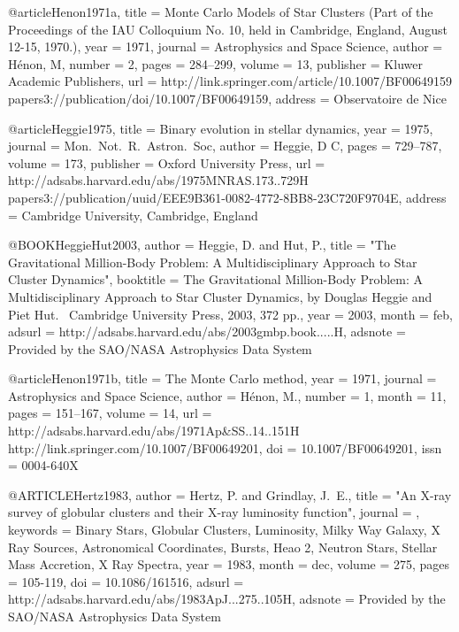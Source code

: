 \documentclass[twocolumn,tighten]{aastex63}
\begin{document}
{{{{{@article{Henon1971a,
    title = {{Monte Carlo Models of Star Clusters (Part of the Proceedings of the IAU Colloquium No. 10, held in Cambridge, England, August 12-15, 1970.)}},
    year = {1971},
    journal = {Astrophysics and Space Science},
    author = {H{\'{e}}non, M},
    number = {2},
    pages = {284--299},
    volume = {13},
    publisher = {Kluwer Academic Publishers},
    url = {http://link.springer.com/article/10.1007/BF00649159 papers3://publication/doi/10.1007/BF00649159},
    address = {Observatoire de Nice}
}

@article{Heggie1975,
    title = {{Binary evolution in stellar dynamics}},
    year = {1975},
    journal = {Mon.~Not.~R.~Astron.~Soc},
    author = {Heggie, D C},
    pages = {729--787},
    volume = {173},
    publisher = {Oxford University Press},
    url = {http://adsabs.harvard.edu/abs/1975MNRAS.173..729H papers3://publication/uuid/EEE9B361-0082-4772-8BB8-23C720F9704E},
    address = {Cambridge University, Cambridge, England}
}

@BOOK{HeggieHut2003,
   author = {{Heggie}, D. and {Hut}, P.},
    title = "{The Gravitational Million-Body Problem: A Multidisciplinary Approach to Star Cluster Dynamics}",
booktitle = {The Gravitational Million-Body Problem: A Multidisciplinary Approach to Star Cluster Dynamics, by Douglas Heggie and Piet Hut.~ Cambridge University Press, 2003, 372 pp.},
     year = 2003,
    month = feb,
   adsurl = {http://adsabs.harvard.edu/abs/2003gmbp.book.....H},
  adsnote = {Provided by the SAO/NASA Astrophysics Data System}
}

@article{Henon1971b,
    title = {{The Monte Carlo method}},
    year = {1971},
    journal = {Astrophysics and Space Science},
    author = {H{\'{e}}non, M.},
    number = {1},
    month = {11},
    pages = {151--167},
    volume = {14},
    url = {http://adsabs.harvard.edu/abs/1971Ap&SS..14..151H http://link.springer.com/10.1007/BF00649201},
    doi = {10.1007/BF00649201},
    issn = {0004-640X}
}

@ARTICLE{Hertz1983,
   author = {{Hertz}, P. and {Grindlay}, J.~E.},
    title = "{An X-ray survey of globular clusters and their X-ray luminosity function}",
  journal = {\apj},
 keywords = {Binary Stars, Globular Clusters, Luminosity, Milky Way Galaxy, X Ray Sources, Astronomical Coordinates, Bursts, Heao 2, Neutron Stars, Stellar Mass Accretion, X Ray Spectra},
     year = 1983,
    month = dec,
   volume = 275,
    pages = {105-119},
      doi = {10.1086/161516},
   adsurl = {http://adsabs.harvard.edu/abs/1983ApJ...275..105H},
  adsnote = {Provided by the SAO/NASA Astrophysics Data System}
}

}}}}}
\end{document}

